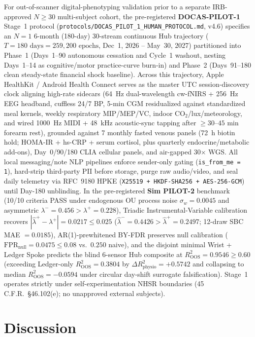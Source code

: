 \documentclass[11pt,twocolumn]{article}
\theoremstyle{plain}
\begin{document}
For out-of-scanner digital-phenotyping validation prior to a separate IRB-approved $N \ge 30$ multi-subject cohort, the pre-registered \textbf{DOCAS-PILOT-1} Stage~1 protocol (\texttt{protocols/DOCAS\_PILOT\_1\_HUMAN\_PROTOCOL.md}, v4.6) specifies an $N=1$ 6-month (180-day) 30-stream continuous Hub trajectory ($T = 180\text{ days} = 259{,}200\text{ epochs}$, Dec~1, 2026 -- May~30, 2027) partitioned into Phase~1 (Days~1--90 autonomous cessation and Cycle~1 washout, nesting Days~1--14 as cognitive/motor practice-curve burn-in) and Phase~2 (Days~91--180 clean steady-state financial shock baseline). Across this trajectory, Apple HealthKit / Android Health Connect serves as the master UTC session-discovery clock aligning high-rate sidecars (64~Hz dual-wavelength cw-fNIRS + 256~Hz EEG headband, cuffless 24/7 BP, 5-min CGM residualized against standardized meal kernels, weekly respiratory MIP/MEP/VC, indoor $\mathrm{CO}_2$/lux/meteorology, and wired 1000~Hz MIDI + 48~kHz acoustic-sync tapping after $\ge 30$--$45\text{ min}$ forearm rest), grounded against 7 monthly fasted venous panels (72~h biotin hold; HOMA-IR + hs-CRP + serum cortisol, plus quarterly endocrine/metabolic add-ons), Day~0/90/180 CLIA cellular panels, and air-gapped 30$\times$ WGS. All local messaging/note NLP pipelines enforce sender-only gating (\texttt{is\_from\_me = 1}), hard-strip third-party PII before storage, purge raw audio/video, and seal daily telemetry via RFC~9180 HPKE (\texttt{X25519 + HKDF-SHA256 + AES-256-GCM}) until Day-180 unblinding. In the pre-registered \textbf{Sim PILOT-2} benchmark (10/10 criteria PASS under endogenous OU process noise $\sigma_w = 0.0045$ and asymmetric $\lambda^- = 0.456 > \lambda^+ = 0.228$), Triadic Instrumental-Variable calibration recovers $|\hat{\lambda}^+ - \lambda^+| = 0.0217 \le 0.025$ ($\hat{\lambda}^- = 0.4426 > \hat{\lambda}^+ = 0.2497$; 12-draw SBC MAE $= 0.0185$), AR(1)-prewhitened BY-FDR preserves null calibration ($\mathrm{FPR}_{\text{null}} = 0.0475 \le 0.08$ vs.\ $0.250$ naive), and the disjoint minimal Wrist + Ledger Spoke predicts the blind 6-sensor Hub composite at $R^2_{\text{OOS}} = 0.9546 \ge 0.60$ (exceeding Ledger-only $R^2_{\text{OOS}} = 0.3804$ by $\Delta R^2_{\text{physio}} = +0.5742$ and collapsing to median $R^2_{\text{OOS}} = -0.0594$ under circular day-shift surrogate falsification). Stage~1 operates strictly under self-experimentation NHSR boundaries (45 C.F.R.\ \S{}46.102(e); no unapproved external subjects).


\FloatBarrier
\section{Discussion}
\end{document}

